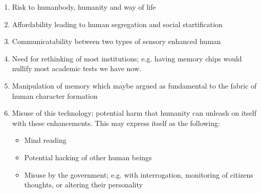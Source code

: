 \begin{enumerate}
    \item Risk to humanbody, humanity and way of life
    \item Affordability leading to human segregation and social startification
    \item Communicatability between two types of sensory enhanced human
    \item Need for rethinking of most institutions; e.g. having memory chips would nullify most academic tests we have now.
    \item Manipulation of memory which maybe argued as fundamental to the fabric of human character formation
    \item Misuse of this technology; potential harm that humanity can unleash on itself with these enhancements. This may express itself as the following:
        \begin{itemize}
            \item Mind reading
            \item Potential hacking of other human beings
            \item Misuse by the government; e.g. with interrogation, monitoring of citizens thoughts, or altering their personality
        \end{itemize}
\end{enumerate}
